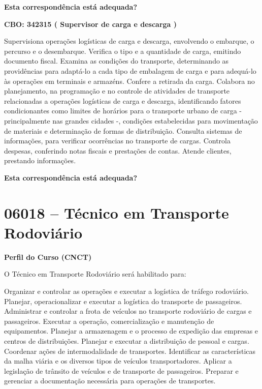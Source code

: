 \documentclass[
]{article}
\begin{document}
\begin{Form}
\textbf{Esta correspondência está adequada?} \\ 
\end{Form}

\textbf{CBO: 342315  ( Supervisor de carga e descarga )}

Supervisiona operações logísticas de carga e descarga, envolvendo o
embarque, o percurso e o desembarque. Verifica o tipo e a quantidade de
carga, emitindo documento fiscal. Examina as condições do transporte,
determinando as providências para adaptá-lo a cada tipo de embalagem de
carga e para adequá-lo às operações em terminais e armazéns. Confere a
retirada da carga. Colabora no planejamento, na programação e no
controle de atividades de transporte relacionadas a operações logísticas
de carga e descarga, identificando fatores condicionantes como limites
de horários para o transporte urbano de carga - principalmente nas
grandes cidades -, condições estabelecidas para movimentação de
materiais e determinação de formas de distribuição. Consulta sistemas de
informações, para verificar ocorrências no transporte de cargas.
Controla despesas, conferindo notas fiscais e prestações de contas.
Atende clientes, prestando informações.

\begin{Form}
\textbf{Esta correspondência está adequada?} \\ 
\end{Form}

\newpage
\section{ 06018 -- Técnico em Transporte Rodoviário }

\textbf{Perfil do Curso (CNCT)}

O Técnico em Transporte Rodoviário será habilitado para:

Organizar e controlar as operações e executar a logística de tráfego
rodoviário. Planejar, operacionalizar e executar a logística do
transporte de passageiros. Administrar e controlar a frota de veículos
no transporte rodoviário de cargas e passageiros. Executar a operação,
comercialização e manutenção de equipamentos. Planejar a armazenagem e o
processo de expedição das empresas e centros de distribuições. Planejar
e executar a distribuição de pessoal e cargas. Coordenar ações de
intermodalidade de transportes. Identificar as características da malha
viária e os diversos tipos de veículos transportadores. Aplicar a
legislação de trânsito de veículos e de transporte de passageiros.
Preparar e gerenciar a documentação necessária para operações de
transportes.
\end{document}
